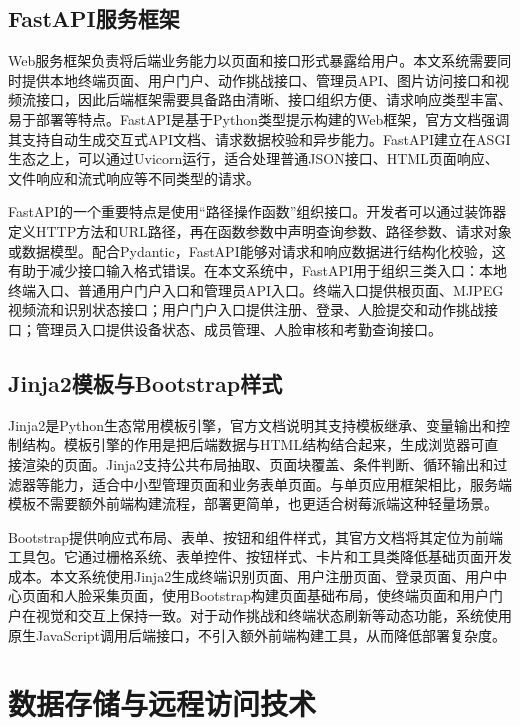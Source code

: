 \subsection{FastAPI服务框架}

Web服务框架负责将后端业务能力以页面和接口形式暴露给用户。本文系统需要同时提供本地终端页面、用户门户、动作挑战接口、管理员API、图片访问接口和视频流接口，因此后端框架需要具备路由清晰、接口组织方便、请求响应类型丰富、易于部署等特点。FastAPI是基于Python类型提示构建的Web框架，官方文档强调其支持自动生成交互式API文档、请求数据校验和异步能力\cite{fastapi}。FastAPI建立在ASGI生态之上，可以通过Uvicorn运行，适合处理普通JSON接口、HTML页面响应、文件响应和流式响应等不同类型的请求。

FastAPI的一个重要特点是使用“路径操作函数”组织接口。开发者可以通过装饰器定义HTTP方法和URL路径，再在函数参数中声明查询参数、路径参数、请求对象或数据模型。配合Pydantic，FastAPI能够对请求和响应数据进行结构化校验，这有助于减少接口输入格式错误。在本文系统中，FastAPI用于组织三类入口：本地终端入口、普通用户门户入口和管理员API入口。终端入口提供根页面、MJPEG视频流和识别状态接口；用户门户入口提供注册、登录、人脸提交和动作挑战接口；管理员入口提供设备状态、成员管理、人脸审核和考勤查询接口。

\subsection{Jinja2模板与Bootstrap样式}

Jinja2是Python生态常用模板引擎，官方文档说明其支持模板继承、变量输出和控制结构\cite{jinja}。模板引擎的作用是把后端数据与HTML结构结合起来，生成浏览器可直接渲染的页面。Jinja2支持公共布局抽取、页面块覆盖、条件判断、循环输出和过滤器等能力，适合中小型管理页面和业务表单页面。与单页应用框架相比，服务端模板不需要额外前端构建流程，部署更简单，也更适合树莓派端这种轻量场景。

Bootstrap提供响应式布局、表单、按钮和组件样式，其官方文档将其定位为前端工具包\cite{bootstrap}。它通过栅格系统、表单控件、按钮样式、卡片和工具类降低基础页面开发成本。本文系统使用Jinja2生成终端识别页面、用户注册页面、登录页面、用户中心页面和人脸采集页面，使用Bootstrap构建页面基础布局，使终端页面和用户门户在视觉和交互上保持一致。对于动作挑战和终端状态刷新等动态功能，系统使用原生JavaScript调用后端接口，不引入额外前端构建工具，从而降低部署复杂度。

\section{数据存储与远程访问技术}

